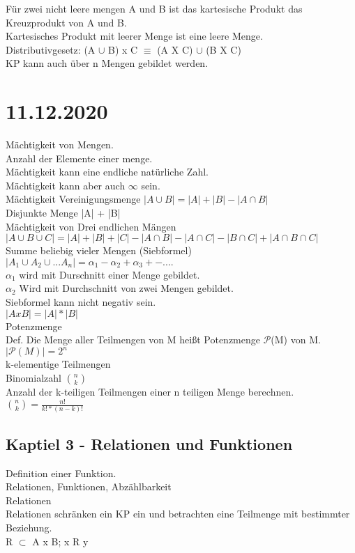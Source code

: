 \documentclass{article}
\begin{document}
	Für zwei nicht leere mengen A und B ist das kartesische Produkt das Kreuzprodukt von A und B. \\
	Kartesisches Produkt mit leerer Menge ist eine leere Menge. \\
	
	Distributivgesetz: (A $\cup$ B) x C $\equiv$ (A X C) $\cup$ (B X C) \\
	KP kann auch über n Mengen gebildet werden.
	
	\section*{11.12.2020}
	Mächtigkeit von Mengen. \\
	Anzahl der Elemente einer menge. \\
	Mächtigkeit kann eine endliche natürliche Zahl. \\
	Mächtigkeit kann aber auch $\infty$ sein. \\
	Mächtigkeit Vereinigungsmenge $| A \cup B | = |A| + |B| - |A \cap B|$ \\
	Disjunkte Menge |A| +  |B| \\
	Mächtigkeit von Drei endlichen Mängen \\
	 $|A \cup B \cup C| = |A| + |B| + |C| - |A \cap B| - |A \cap C| - |B \cap C| + |A \cap B \cap C|$ \\
	 Summe beliebig vieler Mengen (Siebformel)  \\
	 $|A_{1} \cup A_{2} \cup ... A_{n}| = \alpha_{1} - \alpha_{2} + \alpha_{3} +- ....$ \\
	 $\alpha_{1}$ wird mit Durschnitt einer Menge gebildet. \\
	 $\alpha_{2}$ Wird mit Durchschnitt von zwei Mengen gebildet. \\
	 Siebformel kann nicht negativ sein. \\
	 $|A x B| = |A| * |B|$ \\
	 Potenzmenge \\
	 Def. Die Menge aller Teilmengen von M heißt Potenzmenge $\mathcal{P}$(M) von M. \\
	 $|\mathcal{P}(M)| = 2^{n}$ \\
	 k-elementige Teilmengen \\
	 Binomialzahl $\binom{n}{k}$ \\
	 Anzahl der k-teiligen Teilmengen einer n teiligen Menge berechnen. \\
	$ \binom{n}{k} = \frac{n!}{k!*(n-k)!}$ \\
	\subsection*{Kaptiel 3 - Relationen und Funktionen}
	Definition einer Funktion. \\
	Relationen, Funktionen, Abzählbarkeit \\
	Relationen \\
	Relationen schränken ein KP ein und betrachten eine Teilmenge mit bestimmter Beziehung. \\
	R $\subset$ A x B; x R y
\end{document}
